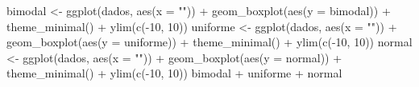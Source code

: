 \documentclass[
  10pt,
  ignorenonframetext,
]{beamer}
\newenvironment{Shaded}{\begin{snugshade}}{\end{snugshade}}
\newcommand{\AttributeTok}[1]{\textcolor[rgb]{0.40,0.45,0.13}{#1}}
\newcommand{\DecValTok}[1]{\textcolor[rgb]{0.68,0.00,0.00}{#1}}
\newcommand{\FunctionTok}[1]{\textcolor[rgb]{0.28,0.35,0.67}{#1}}
\newcommand{\NormalTok}[1]{\textcolor[rgb]{0.00,0.23,0.31}{#1}}
\newcommand{\OtherTok}[1]{\textcolor[rgb]{0.00,0.23,0.31}{#1}}
\newcommand{\SpecialCharTok}[1]{\textcolor[rgb]{0.37,0.37,0.37}{#1}}
\newcommand{\StringTok}[1]{\textcolor[rgb]{0.13,0.47,0.30}{#1}}
\begin{document}
\begin{frame}[fragile]
\begin{Shaded}
\begin{Highlighting}[]
\NormalTok{bimodal }\OtherTok{\textless{}{-}} \FunctionTok{ggplot}\NormalTok{(dados, }\FunctionTok{aes}\NormalTok{(}\AttributeTok{x =} \StringTok{""}\NormalTok{)) }\SpecialCharTok{+}
  \FunctionTok{geom\_boxplot}\NormalTok{(}\FunctionTok{aes}\NormalTok{(}\AttributeTok{y =}\NormalTok{ bimodal)) }\SpecialCharTok{+} \FunctionTok{theme\_minimal}\NormalTok{() }\SpecialCharTok{+}
  \FunctionTok{ylim}\NormalTok{(}\FunctionTok{c}\NormalTok{(}\SpecialCharTok{{-}}\DecValTok{10}\NormalTok{, }\DecValTok{10}\NormalTok{))}
\NormalTok{uniforme }\OtherTok{\textless{}{-}} \FunctionTok{ggplot}\NormalTok{(dados, }\FunctionTok{aes}\NormalTok{(}\AttributeTok{x =} \StringTok{""}\NormalTok{)) }\SpecialCharTok{+}
  \FunctionTok{geom\_boxplot}\NormalTok{(}\FunctionTok{aes}\NormalTok{(}\AttributeTok{y =}\NormalTok{ uniforme)) }\SpecialCharTok{+} \FunctionTok{theme\_minimal}\NormalTok{() }\SpecialCharTok{+}
  \FunctionTok{ylim}\NormalTok{(}\FunctionTok{c}\NormalTok{(}\SpecialCharTok{{-}}\DecValTok{10}\NormalTok{, }\DecValTok{10}\NormalTok{))}
\NormalTok{normal }\OtherTok{\textless{}{-}} \FunctionTok{ggplot}\NormalTok{(dados, }\FunctionTok{aes}\NormalTok{(}\AttributeTok{x =} \StringTok{""}\NormalTok{)) }\SpecialCharTok{+}
  \FunctionTok{geom\_boxplot}\NormalTok{(}\FunctionTok{aes}\NormalTok{(}\AttributeTok{y =}\NormalTok{ normal)) }\SpecialCharTok{+} \FunctionTok{theme\_minimal}\NormalTok{() }\SpecialCharTok{+}
  \FunctionTok{ylim}\NormalTok{(}\FunctionTok{c}\NormalTok{(}\SpecialCharTok{{-}}\DecValTok{10}\NormalTok{, }\DecValTok{10}\NormalTok{))}
\NormalTok{bimodal }\SpecialCharTok{+}\NormalTok{ uniforme }\SpecialCharTok{+}\NormalTok{ normal}
\end{Highlighting}
\end{Shaded}
\end{frame}
\end{document}
